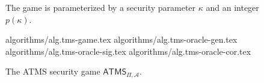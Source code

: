\begin{figure}
  \begin{algorithm}[H]
    The game is parameterized by a security parameter $\kappa$ and an
    integer $p(\kappa)$.
    \caption{\label{alg.tms-game}The game $\textsf{ATMS}_{\Pi,\mathcal{A}}$}

    \begin{algorithmic}[1]
      {algorithms/alg.tms-game.tex}
      {algorithms/alg.tms-oracle-gen.tex}
      {algorithms/alg.tms-oracle-sig.tex}
      {algorithms/alg.tms-oracle-cor.tex}
    \end{algorithmic}
  \end{algorithm}
  \caption{The ATMS security game $\textsf{ATMS}_{\Pi,\mathcal{A}}$.}
  \label{fig:ATMS-game}
\end{figure}
